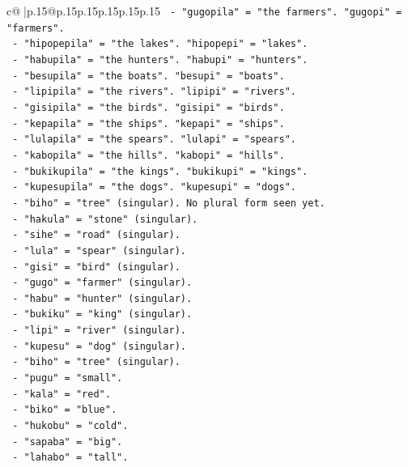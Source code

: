 \documentclass{article}
\begin{document}
{\begin{supertabular}{c@{$\;$}|p{.15\linewidth}@{}p{.15\linewidth}p{.15\linewidth}p{.15\linewidth}p{.15\linewidth}p{.15\linewidth}}
{{{\texttt{  {-} "gugopila" = "the farmers". "gugopi" = "farmers".} \\
\texttt{  {-} "hipopepila" = "the lakes". "hipopepi" = "lakes".} \\
\texttt{  {-} "habupila" = "the hunters". "habupi" = "hunters".} \\
\texttt{  {-} "besupila" = "the boats". "besupi" = "boats".} \\
\texttt{  {-} "lipipila" = "the rivers". "lipipi" = "rivers".} \\
\texttt{  {-} "gisipila" = "the birds". "gisipi" = "birds".} \\
\texttt{  {-} "kepapila" = "the ships". "kepapi" = "ships".} \\
\texttt{  {-} "lulapila" = "the spears". "lulapi" = "spears".} \\
\texttt{  {-} "kabopila" = "the hills". "kabopi" = "hills".} \\
\texttt{  {-} "bukikupila" = "the kings". "bukikupi" = "kings".} \\
\texttt{  {-} "kupesupila" = "the dogs". "kupesupi" = "dogs".} \\
\texttt{  {-} "biho" = "tree" (singular). No plural form seen yet.} \\
\texttt{  {-} "hakula" = "stone" (singular).} \\
\texttt{  {-} "sihe" = "road" (singular).} \\
\texttt{  {-} "lula" = "spear" (singular).} \\
\texttt{  {-} "gisi" = "bird" (singular).} \\
\texttt{  {-} "gugo" = "farmer" (singular).} \\
\texttt{  {-} "habu" = "hunter" (singular).} \\
\texttt{  {-} "bukiku" = "king" (singular).} \\
\texttt{  {-} "lipi" = "river" (singular).} \\
\texttt{  {-} "kupesu" = "dog" (singular).} \\
\texttt{  {-} "biho" = "tree" (singular).} \\
\texttt{  {-} "pugu" = "small".} \\
\texttt{  {-} "kala" = "red".} \\
\texttt{  {-} "biko" = "blue".} \\
\texttt{  {-} "hukobu" = "cold".} \\
\texttt{  {-} "sapaba" = "big".} \\
\texttt{  {-} "lahabo" = "tall".} \\
}}}
\end{supertabular}}
\end{document}
